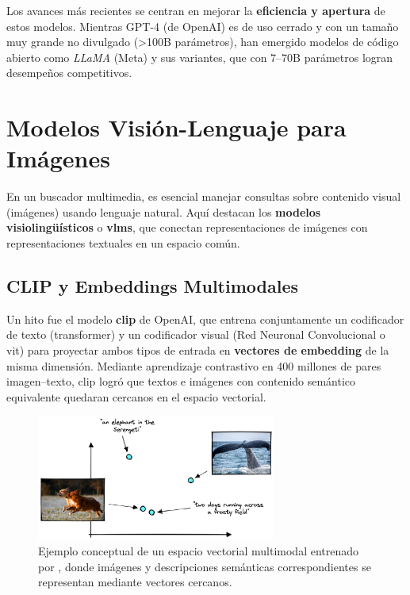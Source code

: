 Los avances más recientes se centran en mejorar la \textbf{eficiencia y apertura} de estos modelos. Mientras GPT-4 (de OpenAI) es de uso cerrado y con un tamaño muy grande no divulgado (>100B parámetros), han emergido modelos de código abierto como \emph{LLaMA} (Meta) y sus variantes, que con 7--70B parámetros logran desempeños competitivos.

\section{Modelos Visión-Lenguaje para Imágenes}

En un buscador multimedia, es esencial manejar consultas sobre contenido visual (imágenes) usando lenguaje natural. Aquí destacan los \textbf{modelos visiolingüísticos} o \textbf{\glspl{vlm}}, que conectan representaciones de imágenes con representaciones textuales en un espacio común.

\subsection{CLIP y Embeddings Multimodales}

Un hito fue el modelo \textbf{\gls{clip}} de OpenAI, que entrena conjuntamente un codificador de texto (transformer) y un codificador visual (Red Neuronal Convolucional o \gls{vit}) para proyectar ambos tipos de entrada en \textbf{vectores de embedding} de la misma dimensión. Mediante aprendizaje contrastivo en 400 millones de pares imagen--texto, \gls{clip} logró que textos e imágenes con contenido semántico equivalente quedaran cercanos en el espacio vectorial.

\begin{figure}[h]
  \centering
  \includegraphics[width=0.7\textwidth]{archivos/clip_space.png}
  \caption[Espacio vectorial multimodal de CLIP]{Ejemplo conceptual de un espacio vectorial multimodal entrenado por , donde imágenes y descripciones semánticas correspondientes se representan mediante vectores cercanos.}
  \label{fig:clip_space}
\end{figure}

